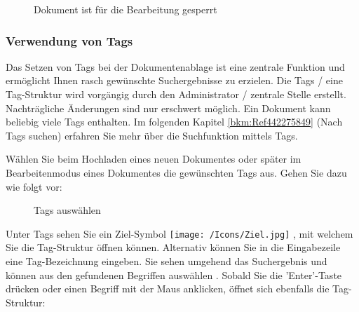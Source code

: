 \begin{figure}[H]
\caption{Dokument ist für die Bearbeitung gesperrt}
\end{figure}

\subsubsection{Verwendung von Tags}
\label{bkm:Ref201801219}

Das Setzen von Tags bei der Dokumentenablage ist eine zentrale Funktion und ermöglicht Ihnen rasch gewünschte Suchergebnisse zu erzielen. Die Tags / eine Tag-Struktur wird vorgängig durch den Administrator / zentrale Stelle erstellt. Nachträgliche Änderungen sind nur erschwert möglich. Ein Dokument kann beliebig viele Tags enthalten. Im folgenden Kapitel \ref{bkm:Ref442275849} (Nach Tags suchen) erfahren Sie mehr über die Suchfunktion mittels Tags. \newline

\vspace{\baselineskip}

Wählen Sie beim Hochladen eines neuen Dokumentes oder später im Bearbeitenmodus eines Dokumentes die gewünschten Tags aus. Gehen Sie dazu wie folgt vor: 

\begin{figure}[H]
\caption{Tags auswählen}
\end{figure}

Unter Tags  sehen Sie ein Ziel-Symbol \texttt{[image: /Icons/Ziel.jpg]} , mit welchem Sie die Tag-Struktur öffnen können. Alternativ können Sie in die Eingabezeile  eine Tag-Bezeichnung eingeben. Sie sehen umgehend das Suchergebnis und können aus den gefundenen Begriffen auswählen . Sobald Sie die 'Enter'-Taste drücken oder einen Begriff mit der Maus anklicken, öffnet sich ebenfalls die Tag-Struktur:


